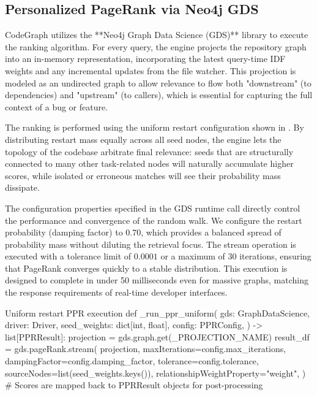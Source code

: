 \subsection{Personalized PageRank via Neo4j GDS}
\label{subsec:ppr-gds}

CodeGraph utilizes the **Neo4j Graph Data Science (GDS)** library to execute the ranking algorithm. For every query, the engine projects the repository graph into an in-memory representation, incorporating the latest query-time IDF weights and any incremental updates from the file watcher. This projection is modeled as an undirected graph to allow relevance to flow both "downstream" (to dependencies) and "upstream" (to callers), which is essential for capturing the full context of a bug or feature.

The ranking is performed using the uniform restart configuration shown in . By distributing restart mass equally across all seed nodes, the engine lets the topology of the codebase arbitrate final relevance: seeds that are structurally connected to many other task-related nodes will naturally accumulate higher scores, while isolated or erroneous matches will see their probability mass dissipate.

The configuration properties specified in the GDS runtime call directly control the performance and convergence of the random walk. We configure the restart probability (damping factor) to $0.70$, which provides a balanced spread of probability mass without diluting the retrieval focus. The stream operation is executed with a tolerance limit of $0.0001$ or a maximum of $30$ iterations, ensuring that PageRank converges quickly to a stable distribution. This execution is designed to complete in under 50 milliseconds even for massive graphs, matching the response requirements of real-time developer interfaces.

\begin{cgpython}[label=lst:ppr-gds, unbreakable]{Uniform restart PPR execution}
def _run_ppr_uniform(
    gds: GraphDataScience,
    driver: Driver,
    seed_weights: dict[int, float],
    config: PPRConfig,
) -> list[PPRResult]:
    projection = gds.graph.get(_PROJECTION_NAME)
    result_df = gds.pageRank.stream(
        projection,
        maxIterations=config.max_iterations,
        dampingFactor=config.damping_factor,
        tolerance=config.tolerance,
        sourceNodes=list(seed_weights.keys()),
        relationshipWeightProperty="weight",
    )
    # Scores are mapped back to PPRResult objects for post-processing
\end{cgpython}

